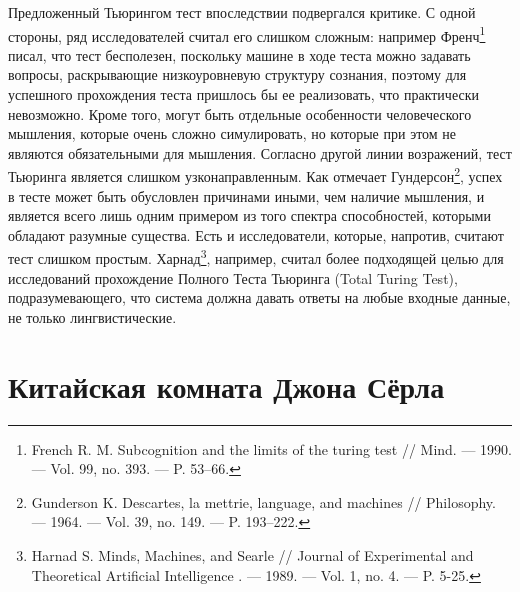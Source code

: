 \documentclass[12pt, specialist, subf, substylefile = spbu.rtx]{disser}
\begin{document}

Предложенный Тьюрингом тест впоследствии подвергался критике. С одной стороны, ряд исследователей считал его слишком сложным: например Френч\footnote{\cite{French1990-FRESAT} French R. M. Subcognition and the limits of the turing test // Mind. — 1990. — Vol. 99, no. 393. — P. 53–66.} писал, что тест бесполезен, поскольку машине в ходе теста можно задавать вопросы, раскрывающие низкоуровневую структуру сознания, поэтому для успешного прохождения теста пришлось бы ее реализовать, что практически невозможно. Кроме того, могут быть отдельные особенности человеческого мышления, которые очень сложно симулировать, но которые при этом не являются обязательными для мышления. Согласно другой линии возражений, тест Тьюринга является слишком узконаправленным. Как отмечает Гундерсон\footnote{\cite{Gunderson1964-KEIDLM} Gunderson K. Descartes, la mettrie, language, and machines // Philosophy. — 1964. — Vol. 39, no. 149. — P. 193–222.
}, успех в тесте может быть обусловлен причинами иными, чем наличие мышления, и является всего лишь одним примером из того спектра способностей, которыми обладают разумные существа. Есть и исследователи, которые, напротив, считают тест слишком простым. Харнад\footnote{\cite{Harnad1989-HARMMA-3} Harnad S. Minds, Machines, and Searle // Journal of Experimental and Theoretical Artificial Intelligence . — 1989. — Vol. 1, no. 4. — P. 5-25.}, например, считал более подходящей целью для исследований прохождение Полного Теста Тьюринга (Total Turing Test), подразумевающего, что система должна давать ответы на любые входные данные, не только лингвистические.



\chapter{Китайская комната Джона Сёрла}
\label{sec:chinese}
\end{document}
